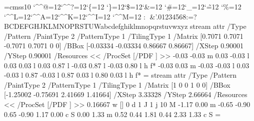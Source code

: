 \font\THFa=cmss10
\begingroup
\catcode`\^^@=12\catcode`\^^?=12\catcode`\{=12
\catcode`\}=12\catcode`\$=12\catcode`\&=12
\catcode`\#=12\catcode`\_=12\catcode`\~=12
\catcode`\%=12
\catcode`\^^L=12\catcode`\^^A=12\catcode`\^^K=12\catcode`\^^I=12
\catcode`\^^M=12
\THFa:^^L^^M&'.01234568:=?BCDEFGHJKLMNOPRSTUWabcdefghiklmnopqrstuvwxyz\endinclude\endgroup
\immediate\pdfobj stream attr {/Type /Pattern
/PaintType 2 /PatternType 1 /TilingType 1
/Matrix [0.7071 0.7071 -0.7071 0.7071 0 0]
/BBox [-0.03334 -0.03334 0.86667 0.86667]
/XStep 0.90001
/YStep 0.90001
/Resources << /ProcSet [/PDF ] >> } {
-0.03 -0.03 m
0.03 -0.03 l
0.03 0.03 l
0.03 0.87 l
-0.03 0.87 l
-0.03 0.80 l
h
f*
-0.03 0.03 m
-0.03 -0.03 l
0.03 -0.03 l
0.87 -0.03 l
0.87 0.03 l
0.80 0.03 l
h
f*
} \newcount \THPb\THPb=\pdflastobj
\immediate\pdfobj stream attr {/Type /Pattern
/PaintType 2 /PatternType 1 /TilingType 1
/Matrix [1 0 0 1 0 0]
/BBox [-1.25002 -0.75691 2.41669 1.41664]
/XStep 3.33328
/YStep 2.66664
/Resources << /ProcSet [/PDF ] >> } {
0.16667 w
[] 0 d
1 J
1 j
10 M
-1.17 0.00 m
-0.65 -0.90 0.65 -0.90 1.17 0.00 c
S
0.00 1.33 m
0.52 0.44 1.81 0.44 2.33 1.33 c
S
} \newcount \THPc\THPc=\pdflastobj
